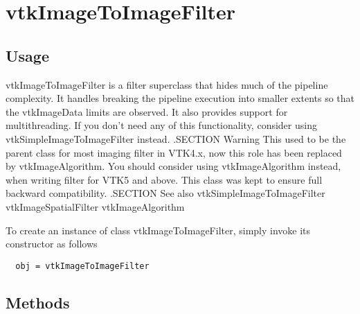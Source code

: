 \section{vtkImageToImageFilter}

\subsection{Usage}

 vtkImageToImageFilter is a filter superclass that hides much of the
 pipeline  complexity. It handles breaking the pipeline execution
 into smaller extents so that the vtkImageData limits are observed. It
 also provides support for multithreading. If you don't need any of this
 functionality, consider using vtkSimpleImageToImageFilter instead.
 .SECTION Warning
 This used to be the parent class for most imaging filter in VTK4.x, now
 this role has been replaced by vtkImageAlgorithm. You should consider
 using vtkImageAlgorithm instead, when writing filter for VTK5 and above.
 This class was kept to ensure full backward compatibility.
 .SECTION See also
 vtkSimpleImageToImageFilter vtkImageSpatialFilter vtkImageAlgorithm

To create an instance of class vtkImageToImageFilter, simply
invoke its constructor as follows
\begin{verbatim}
  obj = vtkImageToImageFilter
\end{verbatim}
\subsection{Methods}

